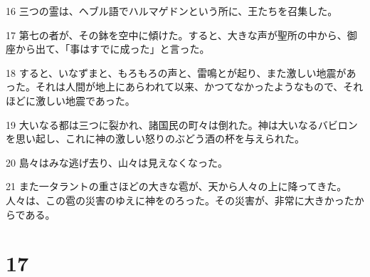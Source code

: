 \par 16 三つの霊は、ヘブル語でハルマゲドンという所に、王たちを召集した。
\par 17 第七の者が、その鉢を空中に傾けた。すると、大きな声が聖所の中から、御座から出て、「事はすでに成った」と言った。
\par 18 すると、いなずまと、もろもろの声と、雷鳴とが起り、また激しい地震があった。それは人間が地上にあらわれて以来、かつてなかったようなもので、それほどに激しい地震であった。
\par 19 大いなる都は三つに裂かれ、諸国民の町々は倒れた。神は大いなるバビロンを思い起し、これに神の激しい怒りのぶどう酒の杯を与えられた。
\par 20 島々はみな逃げ去り、山々は見えなくなった。
\par 21 また一タラントの重さほどの大きな雹が、天から人々の上に降ってきた。人々は、この雹の災害のゆえに神をのろった。その災害が、非常に大きかったからである。

\chapter{17}

